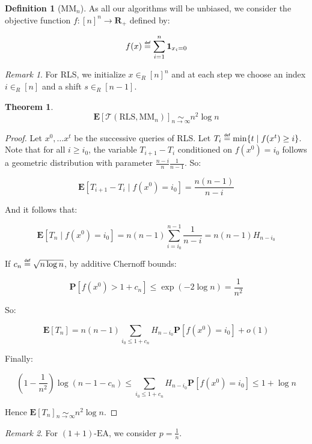\documentclass[12pt]{article}
\theoremstyle{definition}
\newtheorem*{definition}{Definition}
\theoremstyle{plain}
\newtheorem*{theorem}{Theorem}
\theoremstyle{remark}
\newtheorem*{remark}{Remark}
\newcommand{\myequiv}[1]{\underset{#1}{\sim}}
\newcommand\mydef{\mathrel{\overset{\makebox[0pt]{\mbox{\normalfont\tiny\sffamily def}}}{=}}}
\begin{document}
\begin{definition}[$\text{MM}_n$]
    As all our algorithms will be unbiased, we consider the objective function $f:[n]^n\to \mathbf{R}_+$ defined by:

    $$f(x)\mydef \sum_{i=1}^{n} \mathbf{1}_{x_i=0}$$
\end{definition}

\begin{remark}
    For RLS, we initialize $x\in_R [n]^n$ and at each step we choose an index
    $i\in_R [n]$ and a shift $s\in_R [n-1]$.
\end{remark}


\begin{theorem}
    $$\mathbf{E}[\mathcal{T}(\text{RLS},\text{MM}_n)]\myequiv{n\to\infty} n^2 \log n$$
\end{theorem}

\begin{proof}
    Let $x^0, \ldots x^t$ be the successive queries of RLS.
    Let $T_i\mydef \min\{t\mid f(x^t)\ge i\}$. Note that for all $i\ge i_0$, the
    variable $T_{i+1}-T_i$ conditioned on $f(x^0)=i_0$ follows a geometric distribution
    with parameter $\frac{n-i}{n}\frac{1}{n-1}$. So:

    $$\mathbf{E}[T_{i+1}-T_i\mid f(x^0)=i_0]=\frac{n(n-1)}{n-i}$$
    
    And it follows that:
    
    $$\mathbf{E}[T_{n}\mid f(x^0)=i_0]=n(n-1)\sum_{i=i_0}^{n-1} \frac{1}{n-i}=n(n-1)H_{n-i_0}$$

    If $c_n\mydef \sqrt{n\log n}$, by additive Chernoff bounds:

    $$\mathbf{P}[f(x^0)> 1+c_n]\le \exp(-2\log n)=\frac{1}{n^2}$$

    So:

    $$\mathbf{E}[T_n]=n(n-1)\sum_{i_0\le 1+c_n} H_{n-i_0} \mathbf{P}[f(x^0)=i_0]+o(1)$$

    Finally:

    $$\left(1-\frac{1}{n^2}\right)\log(n-1-c_n)\le \sum_{i_0\le 1+c_n} H_{n-i_0} \mathbf{P}[f(x^0)=i_0]\le 1+\log n$$
    
    Hence $\mathbf{E}[T_n]\myequiv{n\to\infty} n^2\log n$.\qedhere

\end{proof}

\begin{remark}
    For $(1+1)\text{-EA}$, we consider $p=\frac{1}{n}$.
\end{remark}
\end{document}
